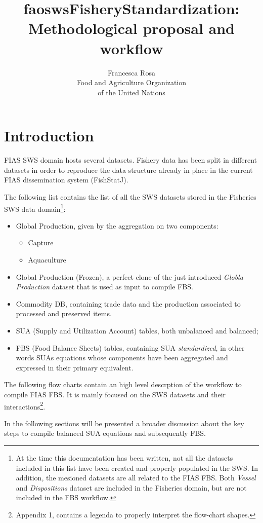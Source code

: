 \documentclass[nojss]{jss}
\title{\bf faoswsFisheryStandardization: Methodological proposal and workflow}
\author{Francesca Rosa\\ Food and Agriculture
    Organization \\ of the United Nations\\}
\begin{document}

\SwaveParseOpstions


\section {Introduction}
FIAS SWS domain hosts several datasets. Fishery data has been split in different datasets in order to reproduce the data structure already in place in the current FIAS dissemination system (FishStatJ).

The following list contains the list of all the SWS datasets stored in the Fisheries SWS data domain\footnote{At the time this documentation has been written, not all the datasets included in this list have been created and properly populated in the SWS. In addition, the mesioned datasets are all related to the FIAS FBS. Both \textit{Vessel} and \textit{Dispositions} dataset are included in the Fisheries domain, but are not included in the FBS workflow.}: 

\begin{itemize}
\item{Global Production, given by the aggregation on two components:}
  \begin{itemize}
    \item {Capture}
    \item {Aquaculture}
  \end{itemize}
\item{Global Production (Frozen), a perfect clone of the just introduced \textit{Globla Production} dataset that is used as input to compile FBS.}  
\item{Commodity DB, containing trade data and the production associated to processed and preserved items.}
\item{SUA (Supply and Utilization Account) tables, both unbalanced and balanced};
\item{FBS (Food Balance Sheets) tables,  containing SUA \textit{standardized}, in other words SUAs equations whose components have been aggregated and expressed in their primary equivalent.}
\end{itemize}

The following flow charts contain an high level descrption of the workflow to compile FIAS FBS. It is mainly focused on the SWS datasets and their interactions\footnote{Appendix 1, contains a legenda to properly interpret the flow-chart shapes.}.

In the following sections will be presented a broader discussion about the key steps  to compile balanced SUA equations and subsequently FBS.
\end{document}
